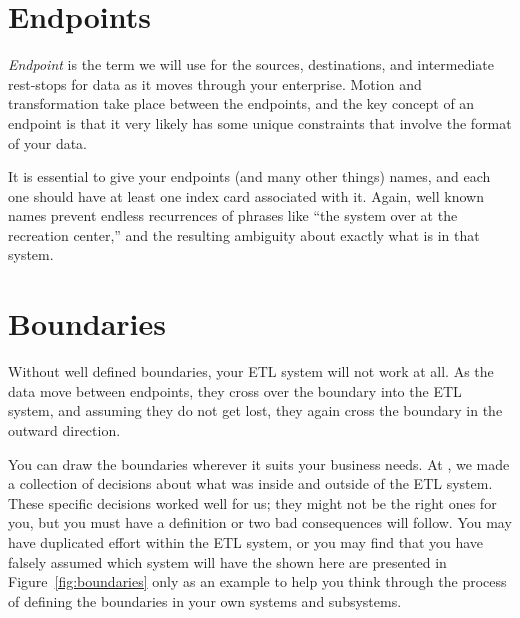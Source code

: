 \documentclass[11pt,letterpaper,twosided]{memoir}
\begin{document}
\section{Endpoints}

\emph{Endpoint} is the term we will use for the sources, destinations,
and intermediate rest-stops for data as it moves through your
enterprise.  Motion and transformation take place between the
endpoints, and the key concept of an endpoint is that it very likely
has some unique constraints that involve the format of your data.

It is essential to give your endpoints (and many other things)
names, and each one should have at least one index card associated
with it. Again, well known names prevent endless recurrences of
phrases like ``the system over at the recreation center,'' and the
resulting ambiguity about exactly what is in that system.

\section{Boundaries}

Without well defined boundaries, your ETL system will not work at
all. As the data move between endpoints, they cross over the boundary
into the ETL system, and assuming they do not get lost, they again
cross the boundary in the outward direction. 

You can draw the boundaries wherever it suits your business needs.
At \UR, we made a collection of decisions about what was inside and
outside of the ETL system. These specific decisions worked
well for us; they might not be the right ones for you, but you
must have a definition or two bad consequences will follow. 
You may have duplicated effort within the ETL system, or you
may find that you have falsely assumed which system will have the
shown here are presented in Figure~\ref{fig:boundaries} only as an
example to help you think through the process of defining the
boundaries in your own systems and subsystems.
\end{document}
